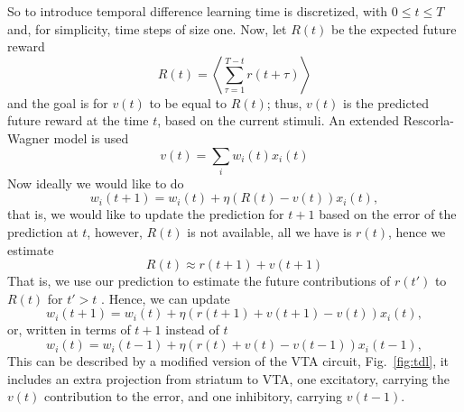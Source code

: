 \documentclass[11pt,a4paper]{scrartcl}
\begin{document}
So to introduce temporal difference learning time is discretized, with
$0\le t\le T$ and, for simplicity, time steps of size one. Now, let $R(t)$ be the expected future reward
\begin{equation}
R(t)=\left\langle \sum_{\tau=1}^{T-t}r(t+\tau)\right\rangle
\end{equation}
and the goal is for $v(t)$ to be equal to $R(t)$; thus, $v(t)$ is the
predicted future reward at the time $t$, based on the current stimuli. An extended Rescorla-Wagner model is used
\begin{equation}
v(t)=\sum_i w_i(t)x_i(t)
\end{equation}
Now ideally we would like to do
\begin{equation}
w_i(t+1)=w_i(t)+\eta(R(t)-v(t))x_i(t),
\end{equation}
that is, we would like to update the prediction for $t+1$ based on the error of the prediction at $t$, however, $R(t)$ is not available, all we have is $r(t)$, hence we estimate
\begin{equation}
R(t)\approx r(t+1)+v(t+1)
\end{equation}
That is, we use our prediction to estimate the future contributions of $r(t')$ to $R(t)$ for $t'>t$ \cite{Barto1995a}. Hence, we can update
\begin{equation}
w_i(t+1)=w_i(t)+\eta(r(t+1)+v(t+1)-v(t))x_i(t),
\end{equation}
or, written in terms of $t+1$ instead of $t$
\begin{equation}
w_i(t)=w_i(t-1)+\eta(r(t)+v(t)-v(t-1))x_i(t-1),
\end{equation}
This can be described by a modified version of the VTA circuit, Fig.~\ref{fig:tdl}, it includes an extra projection from striatum to VTA, one excitatory, carrying the $v(t)$ contribution to the error, and one inhibitory, carrying $v(t-1)$.
\end{document}
